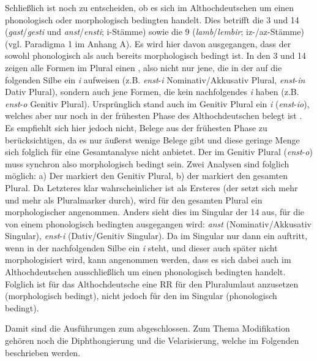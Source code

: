 Schließlich ist noch zu entscheiden, ob es sich im Althochdeutschen um einen phonologisch oder morphologisch bedingten  handelt. Dies betrifft die  3 und 14 (\textit{gast}/\textit{gesti} und \textit{anst}/\textit{ensti}; i-Stäm\-me) sowie die  9 (\textit{lamb}/\textit{lembir}; iz-/az-Stämme) (vgl. Paradigma 1 im Anhang A). Es wird hier davon ausgegangen, dass der  sowohl phonologisch als auch bereits morphologisch bedingt ist. In den  3 und 14 zeigen alle Formen im Plural einen , also nicht nur jene, die in der auf die  folgenden Silbe ein \textit{i} aufweisen (z.B. \textit{enst}-\textit{i} Nominativ/Akkusativ Plural, \textit{enst}-\textit{in} Dativ Plural), sondern auch jene Formen, die kein nachfolgendes \textit{i} haben (z.B. \textit{enst}-\textit{o} Genitiv Plural). Ursprünglich stand auch im Genitiv Plural ein \textit{i} (\textit{enst}-\textit{io}), welches aber nur noch in der frühesten Phase des Althochdeutschen belegt ist \citep[201]{Braune2004}. Es empfiehlt sich hier jedoch nicht, Belege aus der frühesten Phase zu berücksichtigen, da es nur äußerst wenige Belege gibt und diese geringe Menge sich folglich für eine Gesamtanalyse nicht anbietet. Der  im Genitiv Plural (\textit{enst}-\textit{o}) muss synchron also morphologisch bedingt sein. Zwei Analysen sind folglich möglich: a) Der  markiert den Genitiv Plural, b) der  markiert den gesamten Plural. Da Letzteres klar wahrscheinlicher ist als Ersteres (der  setzt sich mehr und mehr als Pluralmarker durch), wird für den gesamten Plural ein morphologischer  angenommen. Anders sieht dies im Singular der  14 aus, für die von einem phonologisch bedingten  ausgegangen wird: \textit{anst} (Nominativ/Akkusativ Singular), \textit{enst}-\textit{i} (Dativ/Genitiv Singular). Da im Singular nur dann ein  auftritt, wenn in der nachfolgenden Silbe ein \textit{i} steht, und dieser auch später nicht morphologisiert wird, kann angenommen werden, dass es sich dabei auch im Althochdeutschen ausschließlich um einen phonologisch bedingten  handelt. Folglich ist für das Althochdeutsche eine RR für den Pluralumlaut anzusetzen (morphologisch bedingt), nicht jedoch für den  im Singular (phonologisch bedingt).

Damit sind die Ausführungen zum  abgeschlossen. Zum Thema Modifikation gehören noch die Diphthongierung und die Velarisierung, welche im Folgenden beschrieben werden.

